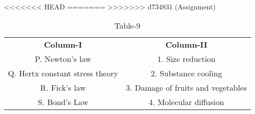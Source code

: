 \begin{table}[htbp]
  \centering
  \caption{Table-9}
<<<<<<< HEAD
  \label{tab:tables/table9.tex}
=======
  \label{table9}
>>>>>>> d734831 (Assignment)
  \begin{tabular}{cc}
\textbf{Column-I} & \textbf{Column-II}\\

P. Newton's law & 1. Size reduction  \\
Q. Hertx constant stress theory & 2. Substance cooling \\
R. Fick's law & 3. Damage of fruits and vegetables \\
S. Bond's Law & 4. Molecular diffusion \\
  
  
  
  \end{tabular}
\end{table}